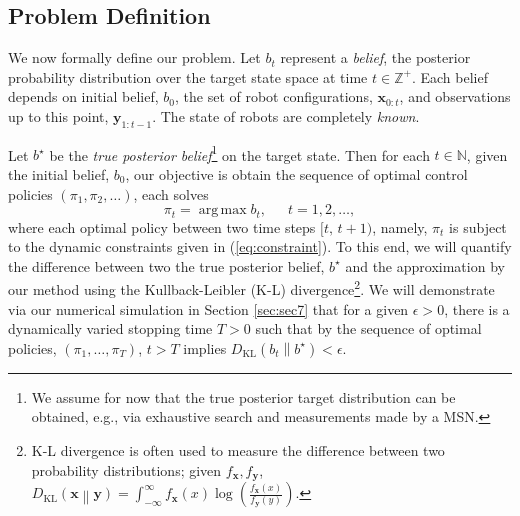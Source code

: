 \documentclass[journal]{IEEEtran}
\DeclareMathOperator*{\argmax}{arg\,max}
\begin{document}
 


\subsection{Problem Definition}
We now formally define our problem.
Let $b_t$ represent a \emph{belief}, the posterior
probability distribution over the target state space at time $t \in \mathbb{Z}^{+}$. Each belief depends on initial belief, $b_0$, the set of robot configurations, $\bm{x}_{0:t}$, and observations up to this point, $\bm{y}_{1:t-1}$.
The state of robots are completely \emph{known}.

Let $b^{\star}$ be the \emph{true posterior belief}\footnote{We assume for now that the true posterior target distribution can be obtained, e.g., via exhaustive search and measurements made by a MSN.} on the target state. 
Then for each $t \in \mathbb{N}$, given the initial belief, $b_0$, our objective is obtain the sequence of optimal control policies $(\pi_1,\pi_2,\dots)$, each solves
\[
\pi_{t} = \argmax b_t,\,\,\,\,\,\,\,\,\,t = 1,2,\dots,
\]
where each optimal policy between two time steps $[t,\,t+1)$, namely, $\pi_t$ is subject to the dynamic constraints given in (\ref{eq:constraint}). 
To this end, we will quantify the difference between two the true posterior belief, $b^{\star}$ and the approximation by our method using the Kullback-Leibler (K-L) divergence\footnote{K-L divergence is often used to measure the difference between two probability distributions; given $f_{\bm{x}},f_{\bm{y}}$,
		$D_{\text{KL}} \left( \bm{x} \middle\| \bm{y} \right) = \int_{-\infty}^{\infty} f_{\bm{x}}(x)\log\left(\frac{f_{\bm{x}}(x)}{f_{\bm{y}}(y)}\right) $.
	}.
We will demonstrate via our numerical simulation in Section \ref{sec:sec7} that for a given $\epsilon>0$, 
there is a dynamically varied stopping time $T >0$ such that 
by the sequence of optimal policies, $(\pi_1,\dots,\pi_T)$, $t > T$ implies 
$D_{\text{KL}}\left(b_{t} \middle\| b^{\star}\right) < \epsilon$.
\end{document}
